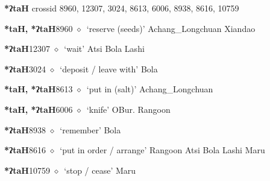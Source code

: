\item
\textbf{*ʔtaH}
  {\tiny crossid 8960, 12307, 3024, 8613, 6006, 8938, 8616, 10759}
  \begin{list}{}{\leftmargin=1.5em \itemindent=-1.5em}
  \item {\footnotesize \textbf{*taH, *ʔtaH}}{\tiny 8960}
         $\diamond$~`reserve (seeds)'
         Achang\_Longchuan 
\hspace{1ex}
         Xiandao 
  \item {\footnotesize \textbf{*ʔtaH}}{\tiny 12307}
\hspace{1ex}
         $\diamond$~`wait'
         Atsi 
\hspace{1ex}
         Bola 
\hspace{1ex}
         Lashi 
  \item {\footnotesize \textbf{*ʔtaH}}{\tiny 3024}
\hspace{1ex}
         $\diamond$~`deposit / leave with'
         Bola 
  \item {\footnotesize \textbf{*taH, *ʔtaH}}{\tiny 8613}
\hspace{1ex}
         $\diamond$~`put in (salt)'
         Achang\_Longchuan 
  \item {\footnotesize \textbf{*taH, *ʔtaH}}{\tiny 6006}
\hspace{1ex}
         $\diamond$~`knife'
         OBur. 
\hspace{1ex}
         Rangoon 
  \item {\footnotesize \textbf{*ʔtaH}}{\tiny 8938}
\hspace{1ex}
         $\diamond$~`remember'
         Bola 
  \item {\footnotesize \textbf{*ʔtaH}}{\tiny 8616}
\hspace{1ex}
         $\diamond$~`put in order / arrange'
         Rangoon 
\hspace{1ex}
         Atsi 
\hspace{1ex}
         Bola 
\hspace{1ex}
         Lashi 
\hspace{1ex}
         Maru 
  \item {\footnotesize \textbf{*ʔtaH}}{\tiny 10759}
\hspace{1ex}
         $\diamond$~`stop / cease'
         Maru 
  \end{list}
